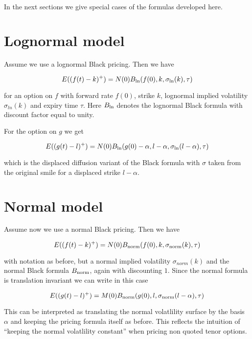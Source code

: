 \documentclass{amsart}
\theoremstyle{plain}
\numberwithin{equation}{section}
\begin{document}
In the next sections we give special cases of the formulas developed here.

\section{Lognormal model}

Assume we use a lognormal Black pricing. Then we have

\begin{equation}
E( (f(t)-k)^+ ) = N(0) B_{\textnormal{ln}}(f(0),k,\sigma_{\textnormal{ln}}(k),\tau)
\end{equation}

for an option on $f$ with forward rate $f(0)$, strike $k$, lognormal implied volatility $\sigma_{ln}(k)$ and expiry time $\tau$. Here $B_{\textnormal{ln}}$ denotes the lognormal Black formula with discount factor equal to unity. 

For the option on $g$ we get

\begin{equation}
E( (g(t)-l)^+ ) = N(0) B_{\textnormal{ln}}(g(0)-\alpha,l-\alpha,\sigma_{\textnormal{ln}}(l-\alpha),\tau)
\end{equation}

which is the displaced diffusion variant of the Black formula with $\sigma$ taken from the original smile for a displaced strike $l-\alpha$.

\section{Normal model}

Assume now we use a normal Black pricing. Then we have

\begin{equation}
E( (f(t)-k)^+ ) = N(0) B_{\textnormal{norm}}(f(0),k,\sigma_{\textnormal{norm}}(k),\tau)
\end{equation}

with notation as before, but a normal implied volatility $\sigma_{norm}(k)$ and the normal Black formula $B_{\textnormal{norm}}$, again with discounting $1$. Since the normal formula is translation invariant we can write in this case

\begin{equation}
E( (g(t)-l)^+ ) = M(0) B_{\textnormal{norm}}(g(0),l,\sigma_{\textnormal{norm}}(l-\alpha),\tau)
\end{equation}

This can be interpreted as translating the normal volatlility surface by the basis $\alpha$ and keeping the pricing formula itself as before. This reflects the intuition of ``keeping the normal volatlility constant'' when pricing non quoted tenor options.
\end{document}
